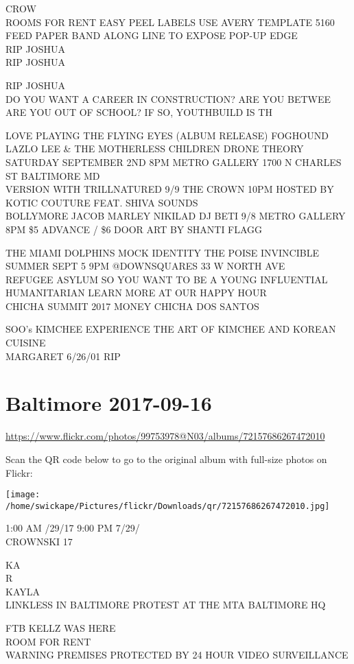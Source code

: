 \documentclass[10pt,letterpaper]{article}
\begin{document}
CROW\\
ROOMS FOR RENT EASY PEEL LABELS USE AVERY TEMPLATE 5160 FEED PAPER BAND ALONG LINE TO EXPOSE POP{-}UP EDGE\\
RIP JOSHUA\\
RIP JOSHUA

RIP JOSHUA\\
DO YOU WANT A CAREER IN CONSTRUCTION?  ARE YOU BETWEE  ARE YOU OUT OF SCHOOL?  IF SO, YOUTHBUILD IS TH

LOVE PLAYING THE FLYING EYES (ALBUM RELEASE) FOGHOUND LAZLO LEE \& THE MOTHERLESS CHILDREN DRONE THEORY SATURDAY SEPTEMBER 2ND 8PM METRO GALLERY 1700 N CHARLES ST BALTIMORE MD\\
VERSION WITH TRILLNATURED 9/9 THE CROWN 10PM HOSTED BY KOTIC COUTURE FEAT. SHIVA SOUNDS\\
BOLLYMORE JACOB MARLEY NIKILAD DJ BETI 9/8 METRO GALLERY 8PM \$5 ADVANCE / \$6 DOOR ART BY SHANTI FLAGG

THE MIAMI DOLPHINS MOCK IDENTITY THE POISE INVINCIBLE SUMMER SEPT 5 9PM @DOWNSQUARES 33 W NORTH AVE\\
REFUGEE ASYLUM SO YOU WANT TO BE A YOUNG INFLUENTIAL HUMANITARIAN LEARN MORE AT OUR HAPPY HOUR\\
CHICHA SUMMIT 2017 MONEY CHICHA DOS SANTOS

SOO's KIMCHEE EXPERIENCE THE ART OF KIMCHEE AND KOREAN CUISINE\\
MARGARET 6/26/01 RIP


\section*{Baltimore 2017-09-16}

\url{https://www.flickr.com/photos/99753978@N03/albums/72157686267472010}

Scan the QR code below to go to the original album with full-size photos on Flickr:

\texttt{[image: /home/swickape/Pictures/flickr/Downloads/qr/72157686267472010.jpg]}


1:00 AM /29/17 9:00 PM 7/29/\\
CROWNSKI 17

KA\\
R\\
KAYLA\\
LINKLESS IN BALTIMORE PROTEST AT THE MTA BALTIMORE HQ

FTB KELLZ WAS HERE\\
ROOM FOR RENT\\
WARNING PREMISES PROTECTED BY 24 HOUR VIDEO SURVEILLANCE
\end{document}
